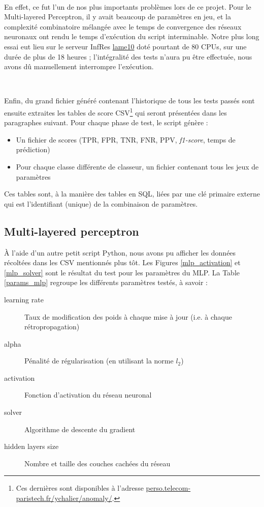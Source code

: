 \documentclass[a4paper]{report}
\begin{document}
~\par

En effet, ce fut l'un de nos plus importants problèmes lors de ce projet. Pour le Multi-layered Perceptron, il y avait beaucoup de paramètres en jeu, et la complexité combinatoire mélangée avec le temps de convergence des réseaux neuronaux ont rendu le temps d'exécution du script interminable. Notre plus long essai eut lieu sur le serveur InfRes \href{http://lame10.enst.fr}{lame10} doté pourtant de 80 CPUs, sur une durée de plus de 18 heures ; l'intégralité des tests n'aura pu être effectuée, nous avons dû manuellement interrompre l'exécution.

~\par

Enfin, du grand fichier généré contenant l'historique de tous les tests passés sont ensuite extraites les tables de score CSV\footnote{Ces dernières sont disponibles à l'adresse \url{perso.telecom-paristech.fr/ychalier/anomaly/}.} qui seront présentées dans les paragraphes suivant. Pour chaque phase de test, le script génère :
\begin{itemize}
\item Un fichier de scores (TPR, FPR, TNR, FNR, PPV, \emph{f1-score}, temps de prédiction)
\item Pour chaque classe différente de classeur, un fichier contenant tous les jeux de paramètres
\end{itemize}
Ces tables sont, à la manière des tables en SQL, liées par une clé primaire externe qui est l'identifiant (unique) de la combinaison de paramètres.


\subsection{Multi-layered perceptron}

\label{section:mlp}

À l'aide d'un autre petit script Python, nous avons pu afficher les données récoltées dans les CSV mentionnés plus tôt. Les Figures \ref{mlp_activation} et \ref{mlp_solver} sont le résultat du test pour les paramètres du MLP. La Table \ref{params_mlp} regroupe les différents paramètres testés, à savoir :
\begin{description}
\item[learning rate] Taux de modification des poids à chaque mise à jour (i.e. à chaque rétropropagation)
\item[alpha] Pénalité de régularisation (en utilisant la norme $l_2$)
\item[activation] Fonction d'activation du réseau neuronal
\item[solver] Algorithme de descente du gradient
\item[hidden layers size] Nombre et taille des couches cachées du réseau
\end{description}
\end{document}
